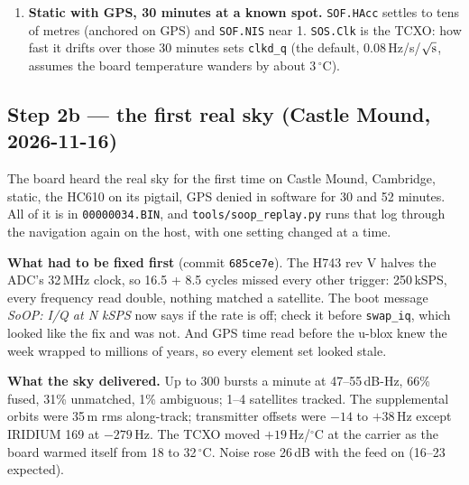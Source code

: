 \documentclass[11pt,a4paper]{article}
\newcommand{\file}[1]{\texttt{\small #1}}
\newcommand{\degC}{$^\circ$C}
\begin{document}
\begin{enumerate}
RTL-SDR. Record step 1's \file{rtl\_sdr} line while the board logs, then run
\file{soop\_bench.py} on the recording: per satellite, compare its burst count, C/N0 and
carrier sigma with the board's \file{SOB}, and gr-iridium's Ring Alert count with
\file{SOR}, the headers the board decoded itself. The board should hear at least what
gr-iridium does in the Ring Alert band: it searches where each tracked satellite is predicted
to be with a lower threshold than a blind search can afford.
\item \textbf{Static with GPS, 30 minutes at a known spot.} \file{SOF.HAcc} settles to tens of
metres (anchored on GPS) and \file{SOF.NIS} near 1. \file{SOS.Clk} is the TCXO: how fast it
drifts over those 30 minutes sets \file{clkd\_q} (the default, 0.08\,Hz/s/$\sqrt{\rm s}$,
assumes the board temperature wanders by about 3\,\degC).
\end{enumerate}

\subsection{Step 2b --- the first real sky (Castle Mound, 2026-11-16)}

The board heard the real sky for the first time on Castle Mound, Cambridge, static, the HC610
on its pigtail, GPS denied in software for 30 and 52 minutes. All of it is in
\file{00000034.BIN}, and \file{tools/soop\_replay.py} runs that log through the navigation
again on the host, with one setting changed at a time.

\textbf{What had to be fixed first} (commit \file{685ce7e}). The H743 rev V halves the ADC's
32\,MHz clock, so 16.5 + 8.5 cycles missed every other trigger: 250\,kSPS, every frequency read
double, nothing matched a satellite. The boot message \emph{SoOP: I/Q at N kSPS} now says if
the rate is off; check it before \file{swap\_iq}, which looked like the fix and was not. And
GPS time read before the u-blox knew the week wrapped to millions of years, so every element
set looked stale.

\textbf{What the sky delivered.} Up to 300 bursts a minute at 47--55\,dB-Hz, 66\% fused, 31\%
unmatched, 1\% ambiguous; 1--4 satellites tracked. The supplemental orbits were 35\,m rms
along-track; transmitter offsets were $-14$ to $+38$\,Hz except IRIDIUM 169 at $-279$\,Hz.
The TCXO moved $+19$\,Hz/\degC{} at the carrier as the board warmed itself from 18 to
32\,\degC. Noise rose 26\,dB with the feed on (16--23 expected).
\end{document}
